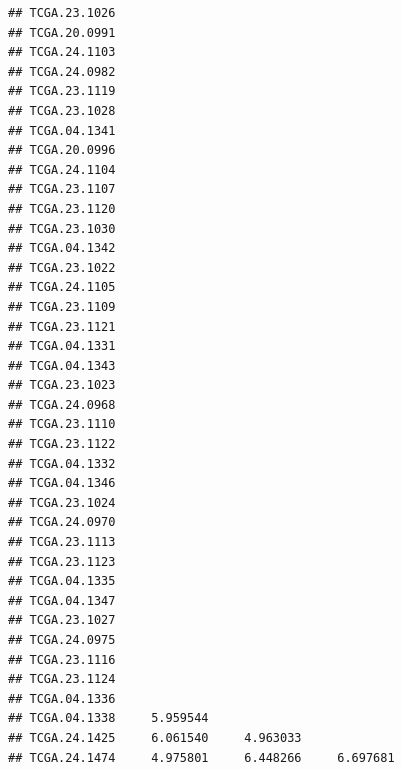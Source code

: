 \documentclass[UTF8]{beamer}\usepackage[]{graphicx}\usepackage[]{color}
\makeatletter
\newenvironment{kframe}{%
 \def\at@end@of@kframe{}%
 \ifinner\ifhmode%
  \def\at@end@of@kframe{\end{minipage}}%
  \begin{minipage}{\columnwidth}%
 \fi\fi%
 \def\FrameCommand##1{\hskip\@totalleftmargin \hskip-\fboxsep
 \colorbox{shadecolor}{##1}\hskip-\fboxsep
     \hskip-\linewidth \hskip-\@totalleftmargin \hskip\columnwidth}%
 \MakeFramed {\advance\hsize-\width
   \@totalleftmargin\z@ \linewidth\hsize
   \@setminipage}}%
 {\par\unskip\endMakeFramed%
 \at@end@of@kframe}
\newenvironment{knitrout}{}{} %
\makeatother
\begin{document}
\begin{frame}[fragile]
\begin{knitrout}
\begin{kframe}
\begin{verbatim}
## TCGA.23.1026                                                    
## TCGA.20.0991                                                    
## TCGA.24.1103                                                    
## TCGA.24.0982                                                    
## TCGA.23.1119                                                    
## TCGA.23.1028                                                    
## TCGA.04.1341                                                    
## TCGA.20.0996                                                    
## TCGA.24.1104                                                    
## TCGA.23.1107                                                    
## TCGA.23.1120                                                    
## TCGA.23.1030                                                    
## TCGA.04.1342                                                    
## TCGA.23.1022                                                    
## TCGA.24.1105                                                    
## TCGA.23.1109                                                    
## TCGA.23.1121                                                    
## TCGA.04.1331                                                    
## TCGA.04.1343                                                    
## TCGA.23.1023                                                    
## TCGA.24.0968                                                    
## TCGA.23.1110                                                    
## TCGA.23.1122                                                    
## TCGA.04.1332                                                    
## TCGA.04.1346                                                    
## TCGA.23.1024                                                    
## TCGA.24.0970                                                    
## TCGA.23.1113                                                    
## TCGA.23.1123                                                    
## TCGA.04.1335                                                    
## TCGA.04.1347                                                    
## TCGA.23.1027                                                    
## TCGA.24.0975                                                    
## TCGA.23.1116                                                    
## TCGA.23.1124                                                    
## TCGA.04.1336                                                    
## TCGA.04.1338     5.959544                                       
## TCGA.24.1425     6.061540     4.963033                          
## TCGA.24.1474     4.975801     6.448266     6.697681             

\end{verbatim}
\end{kframe}
\end{knitrout}
\end{frame}
\end{document}
